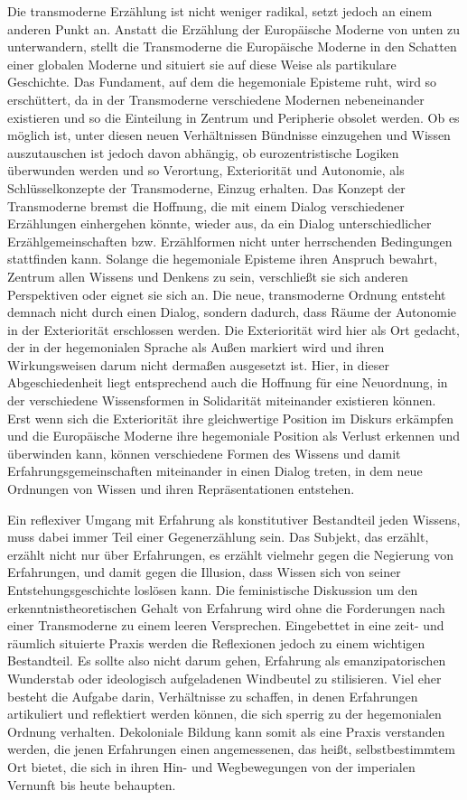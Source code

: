 Die transmoderne Erzählung ist nicht weniger radikal, setzt jedoch an einem
anderen Punkt an. Anstatt die Erzählung der Europäische Moderne von unten zu
unterwandern, stellt die Transmoderne die Europäische Moderne in den Schatten
einer globalen Moderne und situiert sie auf diese Weise als partikulare
Geschichte. Das Fundament, auf dem die hegemoniale Episteme ruht, wird so
erschüttert, da in der Transmoderne verschiedene Modernen nebeneinander
existieren und so die Einteilung in Zentrum und Peripherie obsolet werden. Ob es
möglich ist, unter diesen neuen Verhältnissen Bündnisse einzugehen und Wissen
auszutauschen ist jedoch davon abhängig, ob eurozentristische Logiken überwunden
werden und so Verortung, Exteriorität und Autonomie, als Schlüsselkonzepte der
Transmoderne, Einzug erhalten. Das Konzept der Transmoderne bremst die Hoffnung,
die mit einem Dialog verschiedener Erzählungen einhergehen könnte, wieder aus,
da ein Dialog unterschiedlicher Erzählgemeinschaften bzw. Erzählformen nicht
unter herrschenden Bedingungen stattfinden kann. Solange die hegemoniale
Episteme ihren Anspruch bewahrt, Zentrum allen Wissens und Denkens zu sein,
verschließt sie sich anderen Perspektiven oder eignet sie sich an. Die neue,
transmoderne Ordnung entsteht demnach nicht durch einen Dialog, sondern dadurch,
dass Räume der Autonomie in der Exteriorität erschlossen werden. Die
Exteriorität wird hier als Ort gedacht, der in der hegemonialen Sprache als
Außen markiert wird und ihren Wirkungsweisen darum nicht dermaßen ausgesetzt
ist. Hier, in dieser Abgeschiedenheit liegt entsprechend auch die Hoffnung für
eine Neuordnung, in der verschiedene Wissensformen in Solidarität miteinander
existieren können. Erst wenn sich die Exteriorität ihre gleichwertige Position
im Diskurs erkämpfen und die Europäische Moderne ihre hegemoniale Position  als
Verlust erkennen und überwinden kann, können verschiedene Formen des Wissens und
damit Erfahrungsgemeinschaften miteinander in einen Dialog treten, in dem neue
Ordnungen von Wissen und ihren Repräsentationen entstehen. 

Ein reflexiver Umgang mit Erfahrung als konstitutiver Bestandteil jeden Wissens,
muss dabei immer Teil einer Gegenerzählung sein. Das Subjekt, das erzählt,
erzählt nicht nur über Erfahrungen, es erzählt vielmehr gegen die Negierung von
Erfahrungen, und damit gegen die Illusion, dass Wissen sich von seiner
Entstehungsgeschichte loslösen kann. Die feministische Diskussion um den
erkenntnistheoretischen Gehalt von Erfahrung wird ohne die Forderungen nach
einer Transmoderne zu einem leeren Versprechen. Eingebettet in eine zeit- und
räumlich situierte Praxis werden die Reflexionen jedoch zu einem wichtigen
Bestandteil. Es sollte also nicht darum gehen, Erfahrung als emanzipatorischen
Wunderstab oder ideologisch aufgeladenen Windbeutel zu stilisieren. Viel eher
besteht die Aufgabe darin, Verhältnisse zu schaffen, in denen Erfahrungen
artikuliert und reflektiert werden können, die sich sperrig zu der hegemonialen
Ordnung verhalten.  Dekoloniale Bildung kann somit als eine Praxis verstanden
werden, die jenen Erfahrungen einen angemessenen, das heißt, selbstbestimmtem
Ort bietet,  die sich in ihren Hin- und Wegbewegungen von der imperialen
Vernunft bis heute behaupten.


